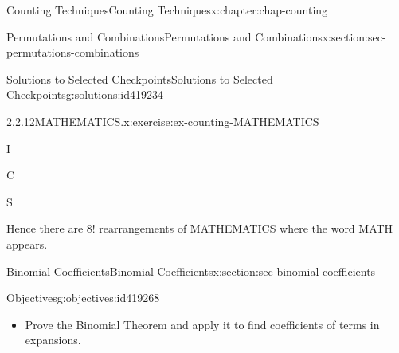 \documentclass[oneside,10pt,]{book}
\newcommand{\blocktitlefont}{\relax}
\numberwithin{equation}{section}
\begin{document}
\begin{chapterptx}{Counting Techniques}{}{Counting Techniques}{}{}{x:chapter:chap-counting}
\begin{sectionptx}{Permutations and Combinations}{}{Permutations and Combinations}{}{}{x:section:sec-permutations-combinations}
\begin{solutions-subsection}{Solutions to Selected Checkpoints}{}{Solutions to Selected Checkpoints}{}{}{g:solutions:id419234}
\begin{inlineexercisesolution}{2.2.12}{MATHEMATICS.}{x:exercise:ex-counting-MATHEMATICS}
\begin{sidebyside}{8}{0.02375}{0.02375}{0.0475}
\begin{sbspanel}{0.07}
\par
I%
\end{sbspanel}%
\begin{sbspanel}{0.07}%
\par
C%
\end{sbspanel}%
\begin{sbspanel}{0.07}%
\par
S%
\end{sbspanel}%
\end{sidebyside}%
\par
Hence there are \(8!\) rearrangements of MATHEMATICS where the word MATH appears.%
\end{inlineexercisesolution}
\end{solutions-subsection}
\end{sectionptx}
%
%
\typeout{************************************************}
\typeout{************************************************}
%
\begin{sectionptx}{Binomial Coefficients}{}{Binomial Coefficients}{}{}{x:section:sec-binomial-coefficients}
\begin{objectives}{Objectives}{g:objectives:id419268}
%
\begin{itemize}[label=\textbullet]
\item{}Prove the Binomial Theorem and apply it to find coefficients of terms in expansions.%

\end{itemize}
\end{objectives}
\end{sectionptx}
\end{chapterptx}
\end{document}
